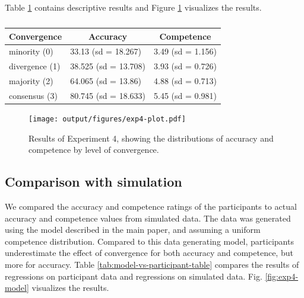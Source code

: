 \documentclass[
  doc,floatsintext]{apa6}
\begin{document}
Table \ref{tab:exp4-table} contains descriptive results and Figure \ref{fig:exp4-plot} visualizes the results.

\begin{table}[tbp]

\begin{center}
\begin{threeparttable}

\caption{\label{tab:exp4-table}}

\begin{tabular}{lll}
\toprule
Convergence & \multicolumn{1}{c}{Accuracy} & \multicolumn{1}{c}{Competence}\\
\midrule
minority (0) & 33.13 (sd = 18.267) & 3.49 (sd = 1.156)\\
divergence (1) & 38.525 (sd = 13.708) & 3.93 (sd = 0.726)\\
majority (2) & 64.065 (sd = 13.86) & 4.88 (sd = 0.713)\\
consensus (3) & 80.745 (sd = 18.633) & 5.45 (sd = 0.981)\\
\bottomrule
\end{tabular}

\end{threeparttable}
\end{center}

\end{table}



\begin{figure}
\centering
\texttt{[image: output/figures/exp4-plot.pdf]}
\caption{\label{fig:exp4-plot}Results of Experiment 4, showing the distributions of accuracy and competence by level of convergence.}
\end{figure}

\subsection{Comparison with simulation}\label{comparison-with-simulation}

We compared the accuracy and competence ratings of the participants to actual accuracy and competence values from simulated data. The data was generated using the model described in the main paper, and assuming a uniform competence distribution. Compared to this data generating model, participants underestimate the effect of convergence for both accuracy and competence, but more for accuracy. Table \ref{tab:model-vs-participant-table} compares the results of regressions on participant data and regressions on simulated data. Fig. \ref{fig:exp4-model} visualizes the results.
\end{document}
